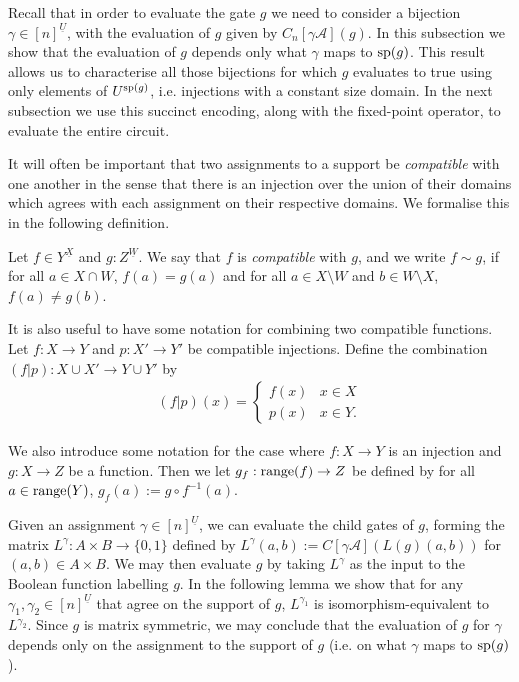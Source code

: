\documentclass[../paper.tex]{subfiles}
\begin{document}
Recall that in order to evaluate the gate $g$ we need to consider a bijection
$\gamma \in [n]^{\underline{U}}$, with the evaluation of $g$ given by
$C_n[\gamma \mathcal{A}](g)$. In this subsection we show that the evaluation of
$g$ depends only what $\gamma$ maps to $\text{sp}(g)$. This result allows us to
characterise all those bijections for which $g$ evaluates to true using only
elements of $U^{\text{sp}(g)}$, i.e. injections with a constant size domain. In the
next subsection we use this succinct encoding, along with the fixed-point
operator, to evaluate the entire circuit.
 
It will often be important that two assignments to a support be
\emph{compatible} with one another in the sense that there is an injection over
the union of their domains which agrees with each assignment on their respective
domains. We formalise this in the following definition.

\begin{definition}
  Let $f \in Y^{\underline{X}}$ and $g : Z^{\underline{W}}$. We say that $f$ is
  \emph{compatible} with $g$, and we write $f \sim g$, if for all $a \in X \cap
  W$, $f(a) = g(a)$ and for all $a \in X \setminus W$ and $b \in W \setminus X$,
  $f(a) \neq g(b)$.
\end{definition}

It is also useful to have some notation for combining two compatible functions.
Let $f : X \rightarrow Y$ and $p: X' \rightarrow Y'$ be compatible injections.
Define the combination $(f | p): X \cup X' \rightarrow Y \cup Y'$ by
\begin{align*}
  (f \vert p) (x) =
  \begin{cases}
    f (x) & x \in X \\
    p (x) & x \in Y.
  \end{cases}
\end{align*}

We also introduce some notation for the case where $f: X \rightarrow Y$ is an
injection and $g: X \rightarrow Z$ be a function. Then we let $g_f : \text{range}(f)
\rightarrow Z$ be defined by for all $a \in \text{range}(Y)$, $g_f(a) := g \circ
f^{-1}(a)$.

Given an assignment $\gamma \in [n]^{\underline{U}}$, we can evaluate the child
gates of $g$, forming the matrix $L^{\gamma} : A \times B \rightarrow \{0,1\}$
defined by $L^{\gamma} (a,b) := C[\gamma \mathcal{A}](L(g)(a,b))$ for $(a,b) \in
A \times B$. We may then evaluate $g$ by taking $L^{\gamma}$ as the input to the
Boolean function labelling $g$. In the following lemma we show that for any
$\gamma_1, \gamma_2 \in [n]^{\underline{U}}$ that agree on the support of $g$,
$L^{\gamma_1}$ is isomorphism-equivalent to $L^{\gamma_2}$. Since $g$ is matrix
symmetric, we may conclude that the evaluation of $g$ for $\gamma$ depends only
on the assignment to the support of $g$ (i.e. on what $\gamma$ maps to
$\text{sp}(g)$).
\end{document}

